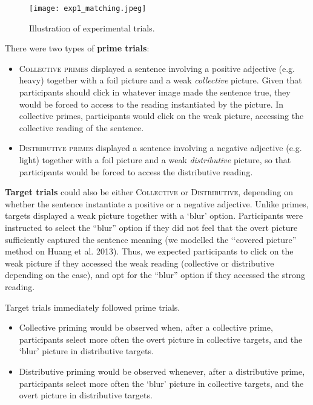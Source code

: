 \documentclass[a4paper]{article}
\begin{document}
\begin{figure}[h!]
  \centering
    \texttt{[image: exp1\_matching.jpeg]}
      \caption{Illustration of experimental trials.}
      \label{fig.examples.item.matching}
\end{figure}

\vspace{.5cm}
\noindent There were two types of \textbf{prime trials}:
\begin{itemize}
\item \textsc{Collective primes} displayed a sentence involving a positive adjective (e.g. heavy) together with a foil picture and a weak \emph{collective} picture. Given that participants should click in whatever image made the sentence true, they would be forced to access to the reading instantiated by the picture. In collective primes, participants would click on the weak picture, accessing the collective reading of the sentence. 
\item \textsc{Distributive primes} displayed a sentence involving a negative adjective (e.g. light) together with a foil picture and a weak \emph{distributive} picture, so that participants would be forced to access the distributive reading. 
\end{itemize}

\noindent \textbf{Target trials} could also be either \textsc{Collective} or \textsc{Distributive}, depending on 
whether the sentence instantiate a positive or a negative adjective. Unlike primes, targets displayed a weak picture together with a `blur' option. Participants were instructed to select the ``blur'' option if they did not feel that the overt picture sufficiently captured the sentence meaning (we modelled the ‘‘covered picture” method on Huang et al. 2013). Thus, we expected participants to click on the weak picture if they accessed the weak reading (collective or distributive depending on the case), and opt for the ``blur'' option if they accessed the strong reading. 

\vspace{.5cm}
\noindent Target trials immediately followed prime trials. 

\begin{itemize}

\item Collective priming would be observed when, after a collective prime, participants  select more often the overt picture in collective targets, and the `blur' picture in distributive targets. 

\item Distributive priming would be observed whenever, after a distributive prime, participants select more often the `blur' picture in collective targets, and the overt picture in distributive targets. 

\end{itemize}
\end{document}
